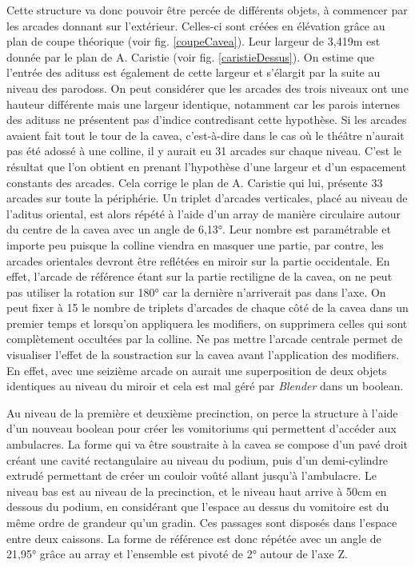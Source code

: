 Cette structure va donc pouvoir être percée de différents objets, à commencer par les arcades donnant sur l'extérieur. Celles-ci sont créées en élévation grâce au plan de coupe théorique (voir fig. \ref{coupeCavea}). Leur largeur de 3,419m est donnée par le plan de A. Caristie (voir fig. \ref{caristieDessus}). On estime que l'entrée des \glspl{aditus} est également de cette largeur et s'élargit par la suite au niveau des \glspl{parodos}. On peut considérer que les arcades des trois niveaux ont une hauteur différente mais une largeur identique, notamment car les parois internes des \glspl{aditus} ne présentent pas d'indice contredisant cette hypothèse. Si les arcades avaient fait tout le tour de la  \gls{cavea}, c'est-à-dire dans le cas où le théâtre n'aurait pas été adossé à une colline, il y aurait eu 31 arcades sur chaque niveau. C'est le résultat que l'on obtient en prenant l'hypothèse d'une largeur et d'un espacement constants des arcades. Cela corrige le plan de A. Caristie qui lui, présente 33 arcades sur toute la périphérie. Un triplet d'arcades verticales, placé au niveau de l'\gls{aditus} oriental, est alors répété à l'aide d'un \gls{array} de manière circulaire autour du centre de la \gls{cavea} avec un angle de 6,13°. Leur nombre est paramétrable et importe peu puisque la colline viendra en masquer une partie, par contre, les arcades orientales devront être reflétées en miroir sur la partie occidentale. En effet, l'arcade de référence étant sur la partie rectiligne de la \gls{cavea}, on ne peut pas utiliser la rotation sur 180° car la dernière n'arriverait pas dans l'axe. On peut fixer à 15 le nombre de triplets d'arcades de chaque côté de la \gls{cavea} dans un premier temps et lorsqu'on appliquera les \glspl{modifier}, on supprimera celles qui sont complètement occultées par la colline. Ne pas mettre l'arcade centrale permet de visualiser l'effet de la soustraction sur la \gls{cavea} avant l'application des \glspl{modifier}. En effet, avec une seizième arcade on aurait une superposition de deux objets identiques au niveau du miroir et cela est mal géré par \textit{Blender} dans un \gls{boolean}. 

 Au niveau de la première et deuxième \gls{precinction}, on perce la structure à l'aide d'un nouveau \gls{boolean} pour créer les \glspl{vomitorium} qui permettent d'accéder aux  \glspl{ambulacre}. La forme qui va être soustraite à la \gls{cavea} se compose d'un pavé droit créant une cavité rectangulaire au niveau du \gls{podium}, puis d'un demi-cylindre extrudé permettant de créer un couloir voûté allant jusqu'à l'\gls{ambulacre}. Le niveau bas est au niveau de la \gls{precinction}, et le niveau haut arrive à 50cm en dessous du  \gls{podium}, en considérant que l'espace au dessus du vomitoire est du même ordre de grandeur qu'un gradin. Ces passages sont disposés dans l'espace entre deux caissons. La forme de référence est donc répétée avec un angle de 21,95° grâce au \gls{array} et l'ensemble est pivoté de 2° autour de l'axe Z. 

